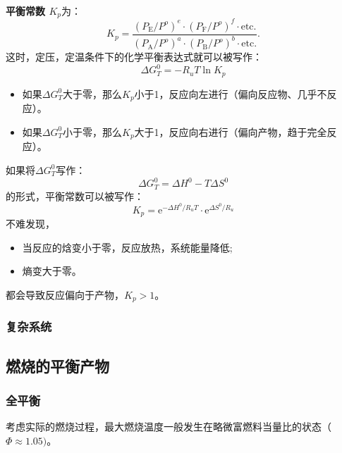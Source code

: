 \textbf{平衡常数 \(K_p\)}为：
\begin{equation}
    K_{p}={\frac{\left(P_{\mathrm{E}}/P^{o}\right)^{e}\cdot\left(P_{\mathrm{F}}/P^{o}\right)^{f}\cdot\mathrm{etc.}}{\left(P_{\mathrm{A}}/P^{o}\right)^{a}\cdot\left(P_{\mathrm{B}}/P^{o}\right)^{b}\cdot\mathrm{etc.}}}.
\end{equation}
这时，定压，定温条件下的化学平衡表达式就可以被写作：
\begin{equation}
    \Delta G_T^0 = -R_u T\ln K_p
\end{equation}
\begin{itemize}
    \item 如果\(\Delta G_T^0\)大于零，那么\(K_p\)小于1，反应向左进行（偏向反应物、几乎不反应）。
    \item 如果\(\Delta G_T^0\)小于零，那么\(K_p\)大于1，反应向右进行（偏向产物，趋于完全反应）。
\end{itemize}

{
    \scriptsize
    如果将\(\Delta G_T^0\)写作：
    \[
        \Delta G_T^0 = \Delta H^0 - T\Delta S^0
    \]
    的形式，平衡常数可以被写作：
    \[
        K_p = \mathrm{e}^{-\Delta H^0/R_u T}\cdot \mathrm{e}^{\Delta S^0/R_u}
    \]
    不难发现，
    \begin{itemize}
        \item 当反应的焓变小于零，反应放热，系统能量降低;
        \item 熵变大于零。
    \end{itemize}都会导致反应偏向于产物，\(K_p>1\)。
}

\subsubsection{复杂系统}

\subsection{燃烧的平衡产物}
\subsubsection{全平衡}
考虑实际的燃烧过程，最大燃烧温度一般发生在略微富燃料当量比的状态（\(\Phi\approx 1.05)\)。
